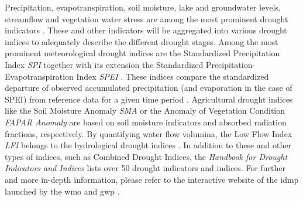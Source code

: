 Precipitation, evapotranspiration, soil moisture, lake and groundwater levels, streamflow and vegetation water stress are among the most prominent drought indicators \autocite{europeandroughtobservatoryDroughtIndicators2017}. These and other indicators will be aggregated into various drought indices to adequately describe the different drought stages. Among the most prominent meteorological drought indices are the Standardized Precipitation Index \textit{SPI} together with its extension the Standardized Precipitation-Evapotranspiration Index \textit{SPEI} \autocite{europeandroughtobservatoryDroughtIndicators2017,ncarStandardizedPrecipitationEvapotranspiration,ncarStandardizedPrecipitationIndex}. These indices compare the standardized departure of observed accumulated precipitation (and evaporation in the case of SPEI) from reference data for a given time period \autocite{ncarStandardizedPrecipitationIndex,ncarStandardizedPrecipitationEvapotranspiration}. Agricultural drought indices like the Soil Moisture Anomaly \textit{SMA} or the Anomaly of Vegetation Condition \textit{FAPAR Anomaly} are based on soil moisture indicators and absorbed radiation fractions, respectively. By quantifying water flow volumina, the Low Flow Index \textit{LFI} belongs to the hydrological drought indices \autocite{europeandroughtobservatoryDroughtIndicators2017, svobodaHandbookDroughtIndicators2016}. In addition to these and other types of indices, such as Combined Drought Indices, the \textit{Handbook for Drought Indicators and Indices} lists over 50 drought indicators and indices. For further and more in-depth information, please refer to the interactive website of the \acrfull{idmp} launched by the \acrfull{wmo} and \acrfull{gwp} \autocite{idmpIndicatorsIndicesIntegrated2021}.

